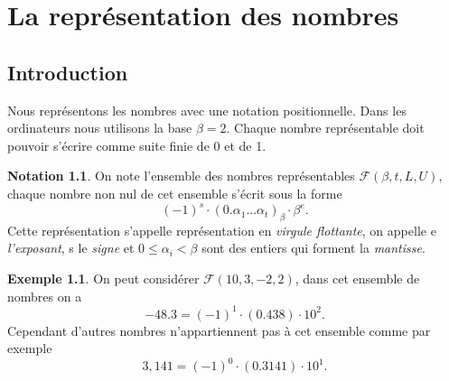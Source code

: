\documentclass[12pt]{book}
\theoremstyle{definition}
\newtheorem{example}[lemma]{Exemple}
\newtheorem{notation}{Notation}
\theoremstyle{remark}
\begin{document}
	\chapter{La représentation des nombres}
	\section{Introduction}
	Nous représentons les nombres avec une notation positionnelle. Dans les ordinateurs nous utilisons la base $\beta = 2$. Chaque nombre représentable doit pouvoir s'écrire comme suite finie de 0 et de 1.
	\begin{notation}
		On note l'ensemble des nombres représentables $\mathcal{F}(\beta, t, L, U)$, chaque  nombre non nul de cet ensemble s'écrit sous la forme \[
			(-1)^s\cdot(0.\alpha_1\ldots\alpha_t)_{\beta}\cdot \beta^{e}
		.\] 
		Cette représentation s'appelle représentation en \emph{virgule flottante}, on appelle e \emph{l'exposant}, s le \emph{signe} et $0 \le \alpha_i < \beta$ sont des entiers qui forment la \emph{mantisse}.
	\end{notation}
	\begin{example}
		On peut considérer $\mathcal{F}(10,3,-2,2)$, dans cet ensemble de nombres on a \[
			-48.3 = (-1)^1\cdot (0.438)\cdot10^2
		.\] 
		Cependant d'autres nombres n'appartiennent pas à cet ensemble comme par exemple \[
			3,141 = (-1)^0\cdot(0.3141)\cdot10^1
		.\] 
	\end{example}
\end{document}
